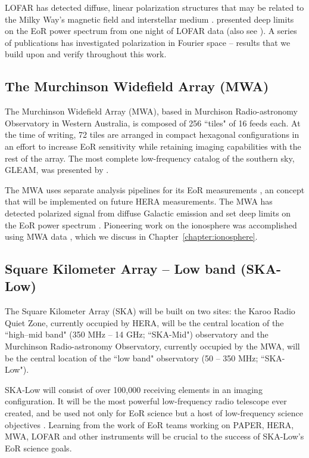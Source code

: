 LOFAR has detected diffuse, linear polarization structures that may be related to the Milky Way's magnetic field and interstellar medium \citep{Jelic.15}. \cite{Patil.17} presented deep limits on the EoR power spectrum from one night of LOFAR data (also see \citet{Yatawatta.13}). A series of publications has investigated polarization in Fourier space \citep{Jelic.14, Asad.15, Asad.16, Asad.17} -- results that we build upon and verify throughout this work.

\subsection{The Murchinson Widefield Array (MWA)}
\label{subsec:mwa_instrument}

The Murchinson Widefield Array (MWA), based in Murchison Radio-astronomy Observatory in Western Australia, is composed of 256 ``tiles" of 16 feeds each. At the time of writing, 72 tiles are arranged in compact hexagonal configurations in an effort to increase EoR sensitivity while retaining imaging capabilities with the rest of the array. The most complete low-frequency catalog of the southern sky, GLEAM, was presented by \cite{Hurley-Walker.17}.

The MWA uses separate analysis pipelines for its EoR measurements \citep{Sullivan.12, Jacobs.16, Trott.16}, an concept that will be implemented on future HERA measurements. The MWA has detected polarized signal from diffuse Galactic emission \citep{Lenc.16, Lenc.17} and set deep limits on the EoR power spectrum \citep[e.g.][]{Dillon.14, Dillon.15}. Pioneering work on the ionosphere was accomplished using MWA data \citep[e.g.][]{Loi.15}, which we discuss in Chapter~\ref{chapter:ionosphere}.

\subsection{Square Kilometer Array -- Low band (SKA-Low)}
\label{subsec:skalow_instrument}

The Square Kilometer Array (SKA) will be built on two sites: the Karoo Radio Quiet Zone, currently occupied by HERA, will be the central location of the ``high--mid band" (350 MHz -- 14 GHz; ``SKA-Mid") observatory and the Murchinson Radio-astronomy Observatory, currently occupied by the MWA, will be the central location of the ``low band" observatory (50 -- 350 MHz; ``SKA-Low").

SKA-Low will consist of over 100,000 receiving elements in an imaging configuration. It will be the most powerful low-frequency radio telescope ever created, and be used not only for EoR science but a host of low-frequency science objectives \citep[e.g.][]{SKABook, Schilizzi.07, Dewdney.09}. Learning from the work of EoR teams working on PAPER, HERA, MWA, LOFAR and other instruments will be crucial to the success of SKA-Low's EoR science goals.

